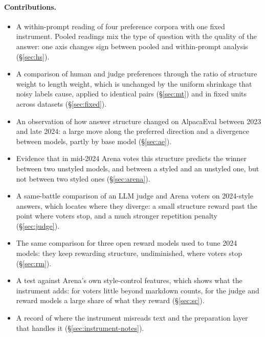 \documentclass[11pt]{article}
\begin{document}
\paragraph{Contributions.}
\begin{itemize}
\item A within-prompt reading of four preference corpora with one fixed instrument. Pooled readings mix the type of question with the quality of the answer: one axis changes sign between pooled and within-prompt analysis (\S\ref{sec:hs}).
\item A comparison of human and judge preferences through the ratio of structure weight to length weight, which is unchanged by the uniform shrinkage that noisy labels cause, applied to identical pairs (\S\ref{sec:mt}) and in fixed units across datasets (\S\ref{sec:fixed}).
\item An observation of how answer structure changed on AlpacaEval between 2023 and late 2024: a large move along the preferred direction and a divergence between models, partly by base model (\S\ref{sec:ae}).
\item Evidence that in mid-2024 Arena votes this structure predicts the winner between two unstyled models, and between a styled and an unstyled one, but not between two styled ones (\S\ref{sec:arena}).
\item A same-battle comparison of an LLM judge and Arena voters on 2024-style answers, which locates where they diverge: a small structure reward past the point where voters stop, and a much stronger repetition penalty (\S\ref{sec:judge}).
\item The same comparison for three open reward models used to tune 2024 models: they keep rewarding structure, undiminished, where voters stop (\S\ref{sec:rm}).
\item A test against Arena's own style-control features, which shows what the instrument adds: for voters little beyond markdown counts, for the judge and reward models a large share of what they reward (\S\ref{sec:sc}).
\item A record of where the instrument misreads text and the preparation layer that handles it (\S\ref{sec:instrument-notes}).
\end{itemize}
\end{document}
